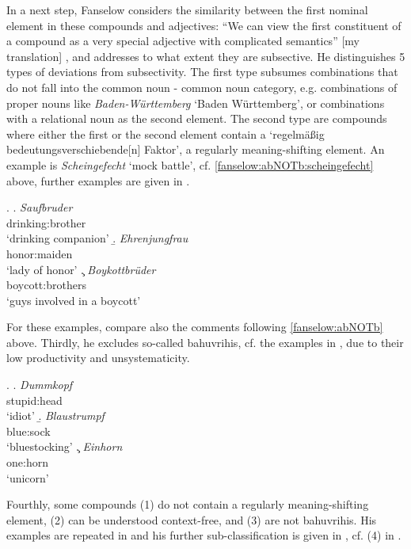 In a next step, Fanselow considers the similarity between the first nominal
element in these compounds and adjectives: ``We can view the first constituent of a compound as a very
  special adjective with complicated semantics'' [my translation]
  \citep[142]{Fanselow:1981}, and addresses to what extent they are
  subsective. 
He distinguishes 5 types of deviations from
  subsectivity. The first type subsumes combinations that do not fall
  into the common noun - common noun
  category, e.g. combinations of proper nouns like \emph{Baden-Württemberg}
  `Baden Württemberg', or combinations with a relational noun as the second
  element. The second type are compounds where either the first or the second element contain a
  `regelmäßig bedeutungsverschiebende[n] Faktor', a regularly meaning-shifting
  element. An example is \emph{Scheingefecht} `mock
  battle', cf. \ref{fanselow:abNOTb:scheingefecht} above, further examples are given in \Next.

  \ex. \a. \gll
  \emph{Saufbruder}\\
  drinking:brother\\
  `drinking companion'
  \b. \gll
  \emph{Ehrenjungfrau}\\
  honor:maiden\\
  `lady of honor' 
  \c. \gll
  \emph{Boykott\-brüder}\\
  boycott:brothers\\
  `guys involved in a boycott'

For these examples, compare also the comments following
\ref{fanselow:abNOTb} above. \enlargethispage{\baselineskip}
Thirdly, he
excludes so-called bahuvrihis, cf. the examples in \Next,  due to their low productivity and
unsystematicity.

\ex. \a. \gll
\emph{Dummkopf}\\
stupid:head\\
`idiot'
\b. \gll
\emph{Blaustrumpf}\\
blue:sock\\
`bluestocking'
\c.  \gll
\emph{Einhorn}\\
one:horn\\
`unicorn'

Fourthly, some compounds (1) do not contain a regularly meaning-shifting element,
(2) can be understood context-free, and (3) are not bahuvrihis. His
examples are repeated in \Next and his further sub-classification is given in \NNext, cf. (4) in \citet[143]{Fanselow:1981}. 


